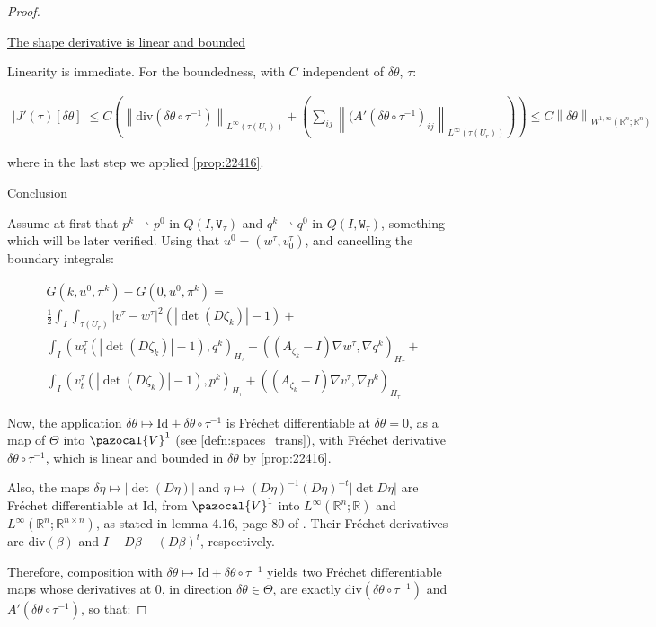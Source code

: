 \documentclass[english,a4paper,10pt,oneside]{scrbook}	%
\theoremstyle{break}
\newenvironment{mproof}[1][\proofname]{%
  \begin{proof}[#1]$ $\par\nobreak\ignorespaces
}{%
  \end{proof}
}
\renewcommand*{\proofname}{Proof}
\theoremstyle{remark}
\newcommand{\mR}{\mathbb{R}}
\newcommand{\cV}{\pazocal{V}}
\newcommand{\norm}[1]{\left\lVert#1\right\rVert}
\newcommand{\cT}{\pazocal{T}}
\newcommand{\id}{\text{Id}}
\newcommand{\te}{\theta}
\newcommand{\Te}{\Theta}
\newcommand{\dive}{\text{div}}
\newcommand{\weakc}{\rightharpoonup}
\newcommand{\tw}[1]{\texttt{#1}}
\begin{document}
\begin{mproof}

\underline{The shape derivative is linear and bounded}

Linearity is immediate. For the boundedness, with $C$ independent of $\delta \te$, $\tau$:

\begin{align*}
|J'(\tau)[\delta \te]| \leq C \left ( \norm{\dive(\delta \te\circ  \tau^{-1})}_{L^\infty(\tau(U_r))}+\left(\sum_{ij} \norm{(A'(\delta\te \circ \tau^{-1})_{ij}}_{L^\infty(\tau(U_r))}\right )\right )\leq
C\norm{\delta \te }_{W^{1,\infty}(\mR^n;\mR^n)}
\end{align*}

where in the last step we applied \cref{prop:22416}. 

\underline{Conclusion}

Assume at first that $p^k \weakc p^0$ in $Q(I,\tw{V}_\tau)$ and $q^k \weakc q^0$ in $Q(I,\tw{W}_\tau)$, something which will be later verified. Using that $u^0=(w^\tau, v_0^\tau)$, and cancelling the boundary integrals:

\begin{align*}
G(k,u^0,\pi^k)-G(0,u^0,\pi^k) =\\
\frac{1}{2}\int_I \int_{\tau(U_r)}|v^\tau-w^\tau|^2(|\det(D\zeta_k)|-1)+\\
\int_I ( w_t^\tau (|\det(D\zeta_k)| -1), q^k)_{H_\tau}+ ((A_{\zeta_k}-I)\nabla w^\tau, \nabla q^k)_{H_\tau}+\\
\int_I (v_t^\tau (|\det(D\zeta_k)|-1),p^k )_{H_\tau} + ((A_{\zeta_k}-I) \nabla v^\tau, \nabla p^k)_{H_\tau} 
\end{align*}

Now, the application $\delta \te \mapsto \id +\delta \te \circ \tau^{-1}$ is Fréchet differentiable at $\delta \te =0$, as a map of $\Te$ into $\cV^1$ (see \cref{defn:spaces_trans}), with Fréchet derivative $\delta \te \circ \tau^{-1}$, which is linear and bounded in $\delta \te$ by \cref{prop:22416}.

Also, the maps $\delta \eta \mapsto |\det(D\eta)|$ and $\eta\mapsto (D\eta)^{-1}(D\eta)^{-t}|\det D\eta|$ are Fréchet differentiable at $\id$, from $\cV^1$ into $L^\infty(\mR^n;\mR)$ and $L^\infty(\mR^n;\mR^{n\times n})$, as stated in lemma 4.16, page 80 of \cite{lindemann}. Their Fréchet derivatives are $\dive (\beta)$ and $I-D\beta-(D\beta)^t$, respectively.

Therefore, composition with  $\delta \te  \mapsto \id+ \delta \te \circ \tau^{-1}$ yields two Fréchet differentiable maps whose derivatives at $0$, in direction $\delta \te \in \Te$, are exactly $\dive(\delta \te \circ \tau^{-1})$ and $A'(\delta \te \circ \tau^{-1})$, so that:


\end{mproof}
\end{document}
